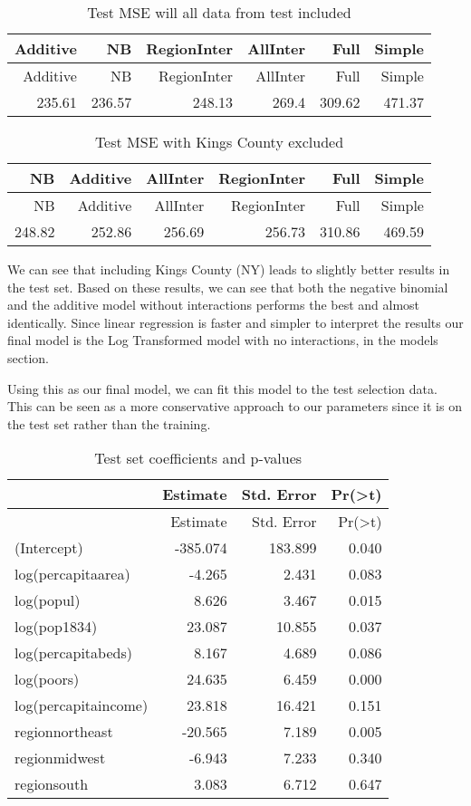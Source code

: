 \documentclass[]{article}
\begin{document}
\begin{longtable}[]{@{}rrrrrr@{}}
\caption{Test MSE will all data from test included}\tabularnewline
\toprule
Additive & NB & RegionInter & AllInter & Full & Simple\tabularnewline
\midrule
\endfirsthead
\toprule
Additive & NB & RegionInter & AllInter & Full & Simple\tabularnewline
\midrule
\endhead
235.61 & 236.57 & 248.13 & 269.4 & 309.62 & 471.37\tabularnewline
\bottomrule
\end{longtable}

\begin{longtable}[]{@{}rrrrrr@{}}
\caption{Test MSE with Kings County excluded}\tabularnewline
\toprule
NB & Additive & AllInter & RegionInter & Full & Simple\tabularnewline
\midrule
\endfirsthead
\toprule
NB & Additive & AllInter & RegionInter & Full & Simple\tabularnewline
\midrule
\endhead
248.82 & 252.86 & 256.69 & 256.73 & 310.86 & 469.59\tabularnewline
\bottomrule
\end{longtable}

We can see that including Kings County (NY) leads to slightly better
results in the test set. Based on these results, we can see that both
the negative binomial and the additive model without interactions
performs the best and almost identically. Since linear regression is
faster and simpler to interpret the results our final model is the Log
Transformed model with no interactions, in the models section.

Using this as our final model, we can fit this model to the test
selection data. This can be seen as a more conservative approach to our
parameters since it is on the test set rather than the training.

\begin{longtable}[]{@{}lrrr@{}}
\caption{Test set coefficients and p-values}\tabularnewline
\toprule
& Estimate & Std. Error &
Pr(\textgreater{}\textbar{}t\textbar{})\tabularnewline
\midrule
\endfirsthead
\toprule
& Estimate & Std. Error &
Pr(\textgreater{}\textbar{}t\textbar{})\tabularnewline
\midrule
\endhead
(Intercept) & -385.074 & 183.899 & 0.040\tabularnewline
log(percapitaarea) & -4.265 & 2.431 & 0.083\tabularnewline
log(popul) & 8.626 & 3.467 & 0.015\tabularnewline
log(pop1834) & 23.087 & 10.855 & 0.037\tabularnewline
log(percapitabeds) & 8.167 & 4.689 & 0.086\tabularnewline
log(poors) & 24.635 & 6.459 & 0.000\tabularnewline
log(percapitaincome) & 23.818 & 16.421 & 0.151\tabularnewline
regionnortheast & -20.565 & 7.189 & 0.005\tabularnewline
regionmidwest & -6.943 & 7.233 & 0.340\tabularnewline
regionsouth & 3.083 & 6.712 & 0.647\tabularnewline
\bottomrule
\end{longtable}
\end{document}
